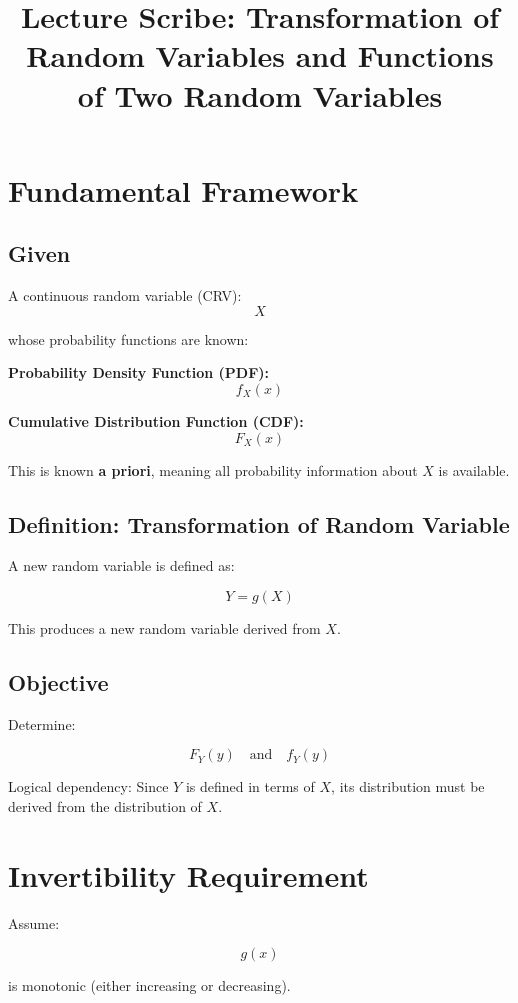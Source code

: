 \documentclass[12pt]{article}
\title{Lecture Scribe: Transformation of Random Variables and Functions of Two Random Variables}
\author{}
\date{}
\begin{document}
\maketitle

\section{Fundamental Framework}

\subsection{Given}

A continuous random variable (CRV):
\[
X
\]

whose probability functions are known:

\textbf{Probability Density Function (PDF):}
\[
f_X(x)
\]

\textbf{Cumulative Distribution Function (CDF):}
\[
F_X(x)
\]

This is known \textbf{a priori}, meaning all probability information about $X$ is available.

\subsection{Definition: Transformation of Random Variable}

A new random variable is defined as:

\[
Y = g(X)
\]

This produces a new random variable derived from $X$.

\subsection{Objective}

Determine:

\[
F_Y(y)
\quad \text{and} \quad
f_Y(y)
\]

Logical dependency: Since $Y$ is defined in terms of $X$, its distribution must be derived from the distribution of $X$.

\section{Invertibility Requirement}

Assume:

\[
g(x)
\]

is monotonic (either increasing or decreasing).
\end{document}
